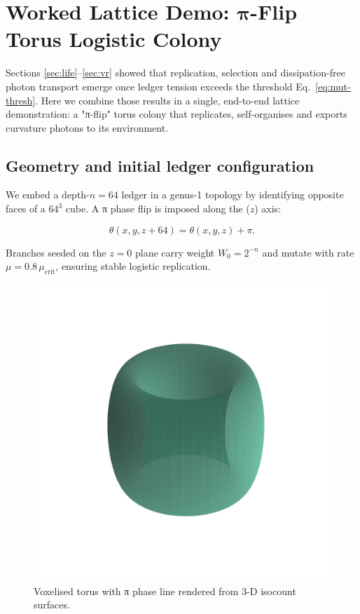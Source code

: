 \section{Worked Lattice Demo: $\boldsymbol{\pi}$-Flip Torus Logistic Colony}
\label{sec:lattice-demo}

Sections \ref{sec:life}–\ref{sec:vr} showed that replication, selection
and dissipation-free photon transport emerge once ledger tension exceeds
the threshold Eq.~\eqref{eq:mut-thresh}.  Here we combine those results
in a single, end-to-end lattice demonstration: a "π-flip" torus colony
that replicates, self-organises and exports curvature photons to its
environment.

\subsection{Geometry and initial ledger configuration}

We embed a depth-$n=64$ ledger in a genus-1 topology by identifying
opposite faces of a $64^3$ cube.  A π phase flip is imposed along the
($z$) axis:

\[
  \theta(x,y,z+64) = \theta(x,y,z)+\pi .
\tag{13.1}\label{eq:pi-flip}
\]

Branches seeded on the $z=0$ plane carry weight
$W_0 = 2^{-n}$ and mutate with rate
$\mu=0.8\,\mu_{\mathrm{crit}}$, ensuring stable logistic replication.

\begin{figure}[t]
  \centering
  \includegraphics[width=\linewidth]{figs/lattice_torus_geometry.png}
  \caption{Voxelised torus with π phase line rendered from 3-D isocount surfaces.}
  \label{fig:torus-geom}
\end{figure}


